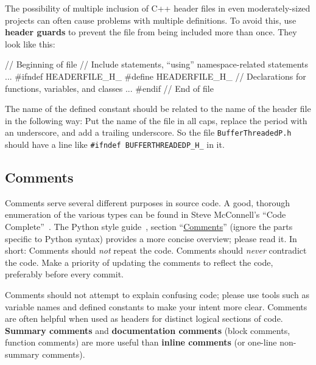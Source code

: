 \documentclass[12pt]{article}
\newcommand{\code}[1]{\texttt{#1}}
\newcommand{\textdef}[1]{\textbf{#1}}
\begin{document}
The possibility of multiple inclusion of C++ header files in even moderately-sized projects can often cause problems with multiple definitions. To avoid this, use \textdef{header guards} to prevent the file from being included more than once. They look like this:
\begin{codeex}
// Beginning of file
// Include statements, ``using'' namespace-related statements
...
#ifndef HEADERFILE_H_
#define HEADERFILE_H_
// Declarations for functions, variables, and classes
...
#endif
// End of file
\end{codeex}
The name of the defined constant should be related to the name of the header file in the following way: Put the name of the file in all caps, replace the period with an underscore, and add a trailing underscore. So the file \code{BufferThreadedP.h} should have a line like \code{\#ifndef BUFFERTHREADEDP\_H\_} in it.

\subsection{Comments}
Comments serve several different purposes in source code. A good, thorough enumeration of the various types can be found in Steve McConnell's ``Code Complete''~\cite{codecomplete}. The Python style guide~\cite{pyguide}, section ``\href{http://www.python.org/dev/peps/pep-0008/#comments}{Comments}'' (ignore the parts specific to Python syntax) provides a more concise overview; please read it. In short: Comments should \emph{not} repeat the code. Comments should \emph{never} contradict the code. Make a priority of updating the comments to reflect the code, preferably before every commit.

Comments should not attempt to explain confusing code; please use tools such as variable names and defined constants to make your intent more clear. Comments are often helpful when used as headers for distinct logical sections of code. \textdef{Summary comments} and \textdef{documentation comments} (block comments, function comments) are more useful than \textdef{inline comments} (or one-line non-summary comments).
\end{document}
